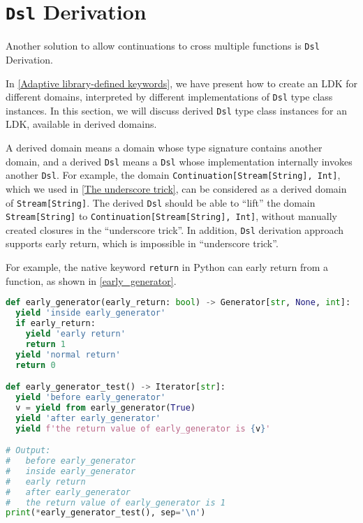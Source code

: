 \section{\lstinline{Dsl} Derivation}\label{Dsl derivation}

Another solution to allow continuations to cross multiple functions is \lstinline{Dsl} Derivation.

In \cref{Adaptive library-defined keywords}, we have present how to create an LDK for different domains, interpreted by different implementations of \lstinline{Dsl} type class instances. In this section, we will discuss derived \lstinline{Dsl} type class instances for an LDK, available in derived domains.

A derived domain means a domain whose type signature contains another domain, and a derived \lstinline{Dsl} means a \lstinline{Dsl} whose implementation internally invokes another \lstinline{Dsl}. For example, the domain \lstinline{Continuation[Stream[String], Int]}, which we used in \cref{The underscore trick}, can be considered as a derived domain of \lstinline{Stream[String]}. The derived \lstinline{Dsl} should be able to ``lift'' the domain \lstinline{Stream[String]} to \lstinline{Continuation[Stream[String], Int]}, without manually created closures in the ``underscore trick''. In addition, \lstinline{Dsl} derivation approach supports early return, which is impossible in ``underscore trick''.

For example, the native keyword \lstinline{return} in Python can early return from a function, as shown in \cref{early_generator}.

\begin{lstlisting}[language=Python,style=Python3,caption={Use \lstinline{yield from} and \lstinline{return} in Python generators},label={early_generator}]
def early_generator(early_return: bool) -> Generator[str, None, int]:
  yield 'inside early_generator'
  if early_return:
    yield 'early return'
    return 1
  yield 'normal return'
  return 0

def early_generator_test() -> Iterator[str]:
  yield 'before early_generator'
  v = yield from early_generator(True)
  yield 'after early_generator'
  yield f'the return value of early_generator is {v}'

# Output:
#   before early_generator
#   inside early_generator
#   early return
#   after early_generator
#   the return value of early_generator is 1
print(*early_generator_test(), sep='\n')
\end{lstlisting}

